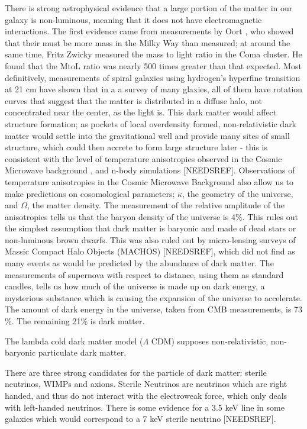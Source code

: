 \documentclass[12pt, twosides]{book}
\begin{document}
There is strong astrophysical evidence that a large portion of the matter in our galaxy is non-luminous, meaning that it does not have electromagnetic interactions. The first evidence came from measurements by Oort \cite{oort32}, who showed that their must be more mass in the Milky Way than measured; at around the same time, Fritz Zwicky \cite{zwicky37} measured the mass to light ratio in the Coma cluster. He found that the MtoL ratio was nearly 500 times greater than that expected. Most definitively, measurements of spiral galaxies using hydrogen's hyperfine transition at 21 cm have shown that in a a survey of many glaxies, all of them have rotation curves that suggest that the matter is distributed in a diffuse halo, not concentrated near the center, as the light is\cite{rubin80}. This dark matter would affect structure formation; as pockets of local overdensity formed, non-relativistic dark matter would settle into the gravitational well and provide many sites of small structure, which could then accrete to form large structure later - this is consistent with the level of temperature anisotropies observed in the Cosmic Microwave background \cite{planck13}, and n-body simulations [NEEDSREF]. Observations of temperature anisotropies in the Cosmic Microwave Background also allow us to make predictions on cosomological parameters; $\kappa$, the geometry of the universe, and $\Omega$, the matter density. The measurement of the relative amplitude of the anisotropies tells us that the baryon density of the universe is 4$\%$. This rules out the simplest assumption that dark matter is baryonic and made of dead stars or non-luminous brown dwarfs. This was also ruled out by micro-lensing surveys of Massic Compact Halo Objects (MACHOS) [NEEDSREF], which did not find as many events as would be predicted by the abundance of dark matter. The measurements of supernova with respect to distance, using them as standard candles, tells us how much of the universe is made up on dark energy, a mysterious substance which is causing the expansion of the universe to accelerate. The amount of dark energy in the universe, taken from CMB measurements, is 73$\%$. The remaining 21$\%$ is dark matter.

The lambda cold dark matter model ($\Lambda$ CDM) supposes non-relativistic, non-baryonic particulate dark matter. 

There are three strong candidates for the particle of dark matter: sterile neutrinos, WIMPs and axions. Sterile Neutrinos are neutrinos which are right handed, and thus do not interact with the electroweak force, which only deals with left-handed neutrinos. There is some evidence for a 3.5 keV line in some galaxies which would correspond to a 7 keV sterile neutrino [NEEDSREF].
\end{document}
